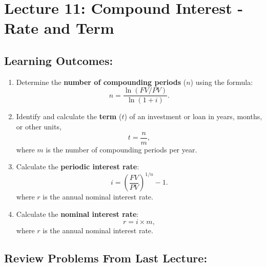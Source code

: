 \documentclass[
]{book}
\begin{document}
\section*{Lecture 11: Compound Interest - Rate and Term}\label{lecture-11-compound-interest---rate-and-term}

\subsection*{Learning Outcomes:}\label{learning-outcomes-10}

\begin{enumerate}
\def\labelenumi{\arabic{enumi}.}
\item
  Determine the \textbf{number of compounding periods} (\(n\)) using the formula:
  \[
   n = \dfrac{\ln(FV/PV)}{\ln(1+i)}.
   \]
\item
  Identify and calculate the \textbf{term} (\(t\)) of an investment or loan in years, months, or other units,
  \[
   t = \frac{n}{m},
   \]
  where \(m\) is the number of compounding periods per year.
\item
  Calculate the \textbf{periodic interest rate}:
  \[
   i = \left(\dfrac{FV}{PV} \right)^{1/n} - 1.
   \]
  where \(r\) is the annual nominal interest rate.
\item
  Calculate the \textbf{nominal interest rate}:
  \[
   r = i \times m,
   \]
  where \(r\) is the annual nominal interest rate.
\end{enumerate}

\subsection*{Review Problems From Last Lecture:}\label{review-problems-from-last-lecture-9}
\end{document}

